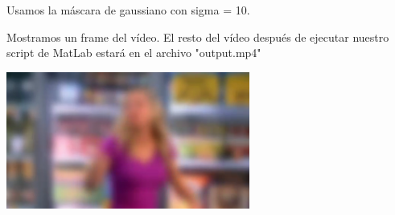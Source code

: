 \documentclass{article}
\begin{document}
\begin{enumerate}
\begin{enumerate}
 Usamos la máscara de gaussiano con sigma = 10. 
 
 Mostramos un frame del vídeo. El resto del vídeo después de ejecutar nuestro script de MatLab estará en el archivo "output.mp4"

 \begin{center}
 \includegraphics[width=0.6\textwidth]{5.png}
 \end{center}
 
 \end{enumerate}

\end{enumerate}
\end{document}
